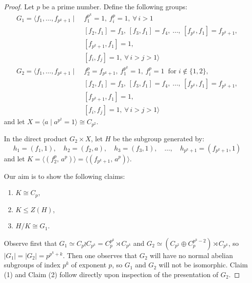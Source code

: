 \documentclass[a4paper,10pt]{amsart}
\theoremstyle{plain}
\theoremstyle{definition}
\begin{document}
\begin{proof}
    Let $p$ be a prime number.  Define the following groups:
    \begin{align*}
    G_1 = \langle f_1, \ldots, f_{p^k+1} \mid\; & f_1^{p^k}=1,\ f_i^p = 1, \ \forall\, i>1 \\
    & [f_2,f_1]=f_3,\ [f_3,f_1]=f_4,\ \ldots,\ [f_{p^k},f_1]=f_{p^k+1}, \\
    & [f_{p^k+1}, f_1]=1, \\
    & [f_i,f_j]=1, \ \forall\, i>j>1 \rangle
    \end{align*}
    \begin{align*}
    G_2 = \langle f_1, \ldots, f_{p^k+1} \mid\; &  f_2^p = f_{p^k+1},\ f_1^{p^k}=1,\ f_i^p=1 \ \text{ for }i \notin \{1,2\}, \\
    & [f_2,f_1]=f_3,\ [f_3,f_1]=f_4,\ \ldots,\ [f_{p^k},f_1]=f_{p^k+1}, \\
    & [f_{p^k+1},f_1]=1, \\
    & [f_i,f_j]=1, \ \forall\, i>j>1 \rangle
    \end{align*}
    and let $X = \langle a \mid a^{p^2} = 1 \rangle \cong C_{p^2}$.
    
    In the direct product $G_2 \times X$, let $H$ be the subgroup generated by:
    \[
   h_1 = (f_1, 1), \quad h_2=(f_2, a), \quad h_3 =(f_3, 1), \quad \ldots, \quad h_{p^k+1}=(f_{p^k+1}, 1)
    \]
    and let $K = \langle (f_2^p,\, a^p) \rangle = \langle (f_{p^k+1},\, a^p) \rangle$.
    
    Our aim is to show the following claims:
    \begin{enumerate}
    \item $K \cong C_p$,
    \item $K \leq Z(H)$,
    \item $H/K \cong G_1$.
    \end{enumerate}

    Observe first that $G_1 \simeq C_p \wr C_{p^k} = C_p^{p^k} \rtimes C_{p^k}$ and $G_2 \simeq (C_{p^2} \oplus C_p^{p^k-2}) \rtimes C_{p^k}$, so $|G_1|=|G_2|=p^{p^k+k}$. Then one observes that $G_2$ will have no normal abelian subgroups of index $p^k$ of exponent $p$, so $G_1$ and $G_2$ will not be isomorphic.  Claim (1) and Claim (2) follow directly upon inspection of the presentation of $G_2$.


\end{proof}
\end{document}
